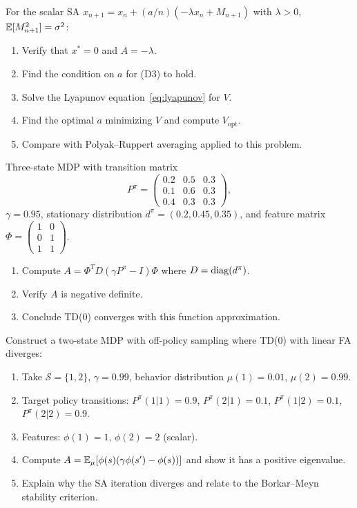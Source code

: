 \documentclass[11pt,a4paper]{article}
\begin{document}
\begin{exercise}
\label{ex:clt-scalar}
For the scalar SA $x_{n+1} = x_n + (a/n)(-\lambda x_n + M_{n+1})$
with $\lambda > 0$, $\mathbb{E}[M_{n+1}^2] = \sigma^2$:
\begin{enumerate}[label=(\alph*)]
  \item Verify that $x^* = 0$ and $A = -\lambda$.
  \item Find the condition on $a$ for (D3) to hold.
  \item Solve the Lyapunov equation~\eqref{eq:lyapunov} for $V$.
  \item Find the optimal $a$ minimizing $V$ and compute
    $V_{\mathrm{opt}}$.
  \item Compare with Polyak--Ruppert averaging applied to this
    problem.
\end{enumerate}
\end{exercise}

\begin{exercise}
\label{ex:hurwitz-td}
Three-state MDP with transition matrix
\[
  P^\pi = \begin{pmatrix}
    0.2 & 0.5 & 0.3 \\ 0.1 & 0.6 & 0.3 \\ 0.4 & 0.3 & 0.3
  \end{pmatrix},
\]
$\gamma = 0.95$, stationary distribution
$d^\pi = (0.2, 0.45, 0.35)$, and feature matrix
$\Phi = \begin{pmatrix} 1 & 0 \\ 0 & 1 \\ 1 & 1 \end{pmatrix}$.
\begin{enumerate}[label=(\alph*)]
  \item Compute $A = \Phi^T D(\gamma P^\pi - I)\Phi$ where
    $D = \operatorname{diag}(d^\pi)$.
  \item Verify $A$ is negative definite.
  \item Conclude TD(0) converges with this function approximation.
\end{enumerate}
\end{exercise}

\begin{exercise}
\label{ex:deadly-triad}
Construct a two-state MDP with off-policy sampling where TD(0)
with linear FA diverges:
\begin{enumerate}[label=(\alph*)]
  \item Take $\mathcal{S} = \{1,2\}$, $\gamma = 0.99$, behavior
    distribution $\mu(1) = 0.01$, $\mu(2) = 0.99$.
  \item Target policy transitions: $P^\pi(1|1) = 0.9$,
    $P^\pi(2|1) = 0.1$, $P^\pi(1|2) = 0.1$,
    $P^\pi(2|2) = 0.9$.
  \item Features: $\phi(1) = 1$, $\phi(2) = 2$ (scalar).
  \item Compute $A = \mathbb{E}_\mu[\phi(s)(\gamma\phi(s') - \phi(s))]$
    and show it has a positive eigenvalue.
  \item Explain why the SA iteration diverges and relate to the
    Borkar--Meyn stability criterion.
\end{enumerate}
\end{exercise}
\end{document}
